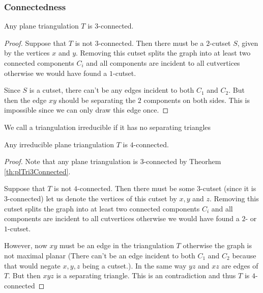 \subsubsection{Connectedness}
\begin{thrm}
Any plane triangulation $T$ is $3$-connected.
\label{th:plTri3Connected}
\end{thrm}

\begin{proof}
Suppose that $T$ is not $3$-connected. Then there must be a $2$-cutset $S$, given by the vertices $x$ and $y$. Removing this cutset splits the graph into at least two connected components $C_i$ and all components are incident to all cutvertices otherwise we would have found a $1$-cutset.

Since $S$ is a cutset, there can't be any edges incident to both $C_1$ and $C_2$. But then the edge $xy$ should be separating the $2$ components on both sides. This is impossible since we can only draw this edge once. %
\end{proof}

\begin{defi}
We call a triangulation irreducible if it has no separating triangles
\end{defi}


\begin{thrm}
Any irreducible plane triangulation $T$ is $4$-connected.
\end{thrm}

\begin{proof}
Note that any plane triangulation is $3$-connected by Theorhem \ref{th:plTri3Connected}.

Suppose that $T$ is not $4$-connected. Then there must be some $3$-cutset (since it is $3$-connected) let us denote the vertices of this cutset by $x, y$ and $z$. Removing this cutset splits the graph into at least two connected components $C_i$ and all components are incident to all cutvertices otherwise we would have found a $2$- or $1$-cutset.  

However, now $xy$ must be an edge in the triangulation $T$ otherwise the graph is not maximal planar (There can't be an edge incident to both $C_1$ and $C_2$ because that would negate $x, y ,z$ being a cutset.). In the same way $yz$ and $xz$ are edges of $T$. But then $xyz$ is a separating triangle. This is an contradiction and thus $T$ is $4$-connected
\end{proof}

